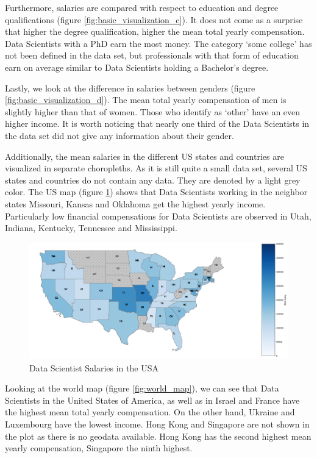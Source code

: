 \documentclass{article}
\begin{document}
Furthermore, salaries are compared with respect to education and degree qualifications (figure \ref{fig:basic_visualization_c}). It does not come as a surprise that higher the degree qualification, higher the mean total yearly compensation. Data Scientists with a PhD earn the most money. The category ‘some college' has not been defined in the data set, but professionals with that form of education earn on average similar to Data Scientists holding a Bachelor's degree.

Lastly, we look at the difference in salaries between genders (figure \ref{fig:basic_visualization_d}). The mean total yearly compensation of men is slightly higher than that of women. Those who identify as ‘other' have an even higher income. It is worth noticing that nearly one third of the Data Scientists in the data set did not give any information about their gender. 

Additionally, the mean salaries in the different US states and countries are visualized in separate choropleths. As it is still quite a small data set, several US states and countries do not contain any data. They are denoted by a light grey color. The US map (figure \ref{fig:US_map}) shows that Data Scientists working in the neighbor states Missouri, Kansas and Oklahoma get the highest yearly income. Particularly low financial compensations for Data Scientists are observed in Utah, Indiana, Kentucky, Tennessee and Mississippi.

\begin{figure}
    \centering
    \includegraphics[width=1.05\linewidth]{NeurIPS_style/figures/usa_map.png}
    \caption{Data Scientist Salaries in the USA}
    \label{fig:US_map}
\end{figure}
 

Looking at the world map (figure \ref{fig:world_map}), we can see that Data Scientists in the United States of America, as well as in Israel and France have the highest mean total yearly compensation. On the other hand, Ukraine and Luxembourg have the lowest income. Hong Kong and Singapore are not shown in the plot as there is no geodata available. Hong Kong has the second highest mean yearly compensation, Singapore the ninth highest.
\end{document}
